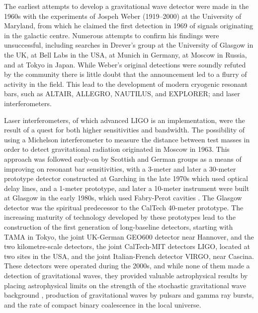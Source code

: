 The earliest attempts to develop a gravitational wave detector were
made in the 1960s with the experiments of Jospeh Weber (1919--2000) at
the University of Maryland, from which he claimed the first detection
in 1969\cite{1969PhRvL..22.1320W,1970PhRvL..24..276W} of signals
originating in the galactic centre\cite{1970PhRvL..25..180W}. Numerous
attempts to confirm his findings were unsuccessful, including searches
in Drever's group at the University of Glasgow
\cite{1973Natur.246..340D} in the UK, at Bell Labs
\cite{1973PhRvL..31..173L,1973PhRvL..31..176G,1974PhRvL..33..794L} in
the USA, at Munich\cite{1975NCimL..12..111B,1975NCimL..12..111B} in
Germany, at Moscow\cite{1973PhLA...45..271B} in Russia, and at
Tokyo\cite{1975PhRvL..35..890H} in Japan. While Weber's original
detections were soundly refuted by the community there is little doubt
that the announcement led to a flurry of activity in the field. This
lead to the development of modern cryogenic resonant bars, such as
ALTAIR\cite{1992NCimC..15..943B}, ALLEGRO\cite{2000IJMPD...9..229M},
NAUTILUS\cite{1997APh.....7..231A}, and
EXPLORER\cite{1993PhRvD..47..362A}; and laser interferometers.

Laser interferometers, of which advanced LIGO is an implementation,
were the result of a quest for both higher sensitivities and
bandwidth. The possibility of using a Michelson interferometer to
measure the distance between test masses in order to detect
gravitational radiation originated in Moscow\cite{1963JETP...16..433G}
in 1963.  This approach was followed early-on by Scottish and German
groups as a means of improving on resonant bar sensitivities, with a
3-meter and later a 30-meter prototype detector constructed at
Garching in the late
1970s\cite{1979JPhE...12.1043B,1988PhRvD..38..423S} which used optical
delay lines, and a 1-meter prototype, and later a 10-meter instrument
were built at Glasgow in the early
1980s\cite{1979RSPSA.368...11D,1995RScI...66.4447R}, which used
Fabry-Perot cavities . The Glasgow detector was the spiritual
predecessor to the CalTech 40-meter
prototype\cite{1996PhLA..218..157A}. The increasing maturity of
technology developed by these prototypes lead to the construction of
the first generation of long-baseline detectors, starting with TAMA in
Tokyo\cite{1996JKASS..29..279K}, the joint UK-German GEO600
detector\cite{1997CQGra..14.1471L} near Hannover, and the two
kilometre-scale detectors, the joint CalTech-MIT detectors
LIGO\cite{1992Sci...256..325A}, located at two sites in the USA, and
the joint Italian-French detector VIRGO\cite{1990NIMPA.289..518B},
near Cascina. These detectors were operated during the 2000s, and
while none of them made a detection of gravitational waves, they
provided valuable astrophysical results by placing astrophysical
limits on the strength of the stochastic gravitational wave background
\cite{2014PhRvL.113w1101A}, production of gravitational waves by
pulsars\cite{2014ApJ...785..119A} and gamma ray
bursts\cite{2012ApJ...760...12A}, and the rate of compact binary
coalescence in the local
universe\cite{2012PhRvD..85h2002A,2013PhRvD..87b2002A}.

